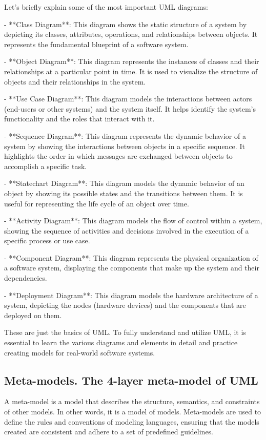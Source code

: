 \documentclass{article}
\begin{document}
Let's briefly explain some of the most important UML diagrams:

- **Class Diagram**: This diagram shows the static structure of a system by depicting its classes, attributes, operations, and relationships between objects. It represents the fundamental blueprint of a software system.

- **Object Diagram**: This diagram represents the instances of classes and their relationships at a particular point in time. It is used to visualize the structure of objects and their relationships in the system.

- **Use Case Diagram**: This diagram models the interactions between actors (end-users or other systems) and the system itself. It helps identify the system's functionality and the roles that interact with it.

- **Sequence Diagram**: This diagram represents the dynamic behavior of a system by showing the interactions between objects in a specific sequence. It highlights the order in which messages are exchanged between objects to accomplish a specific task.

- **Statechart Diagram**: This diagram models the dynamic behavior of an object by showing its possible states and the transitions between them. It is useful for representing the life cycle of an object over time.

- **Activity Diagram**: This diagram models the flow of control within a system, showing the sequence of activities and decisions involved in the execution of a specific process or use case.

- **Component Diagram**: This diagram represents the physical organization of a software system, displaying the components that make up the system and their dependencies.

- **Deployment Diagram**: This diagram models the hardware architecture of a system, depicting the nodes (hardware devices) and the components that are deployed on them.

These are just the basics of UML. To fully understand and utilize UML, it is essential to learn the various diagrams and elements in detail and practice creating models for real-world software systems.


\subsection{Meta-models. The 4-layer meta-model of UML}

A meta-model is a model that describes the structure, semantics, and constraints of other models. In other words, it is a model of models. Meta-models are used to define the rules and conventions of modeling languages, ensuring that the models created are consistent and adhere to a set of predefined guidelines.
\end{document}
